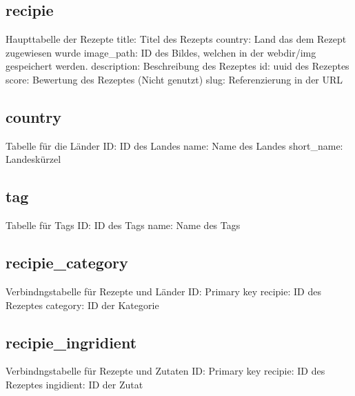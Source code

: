 \documentclass{article}
\begin{document}
\subsection{recipie}
Haupttabelle der Rezepte
\newline
title: Titel des Rezepts
\newline
country: Land das dem Rezept zugewiesen wurde
\newline
image\_path: ID des Bildes, welchen in der webdir/img gespeichert werden.
\newline
description: Beschreibung des Rezeptes
\newline
id: uuid des Rezeptes
\newline
score: Bewertung des Rezeptes (Nicht genutzt)
\newline
slug: Referenzierung in der URL

\pagebreak

\subsection{country}
Tabelle für die Länder
\newline
ID: ID des Landes
\newline
name: Name des Landes
\newline
short\_name: Landeskürzel

\subsection{tag}
Tabelle für Tags
\newline
ID: ID des Tags
\newline
name: Name des Tags

\subsection{recipie\_category}
Verbindngstabelle für Rezepte und Länder
\newline
ID: Primary key
\newline
recipie: ID des Rezeptes
\newline
category: ID der Kategorie

\subsection{recipie\_ingridient}
Verbindngstabelle für Rezepte und Zutaten
\newline
ID: Primary key
\newline
recipie: ID des Rezeptes
\newline
ingidient: ID der Zutat
\end{document}
